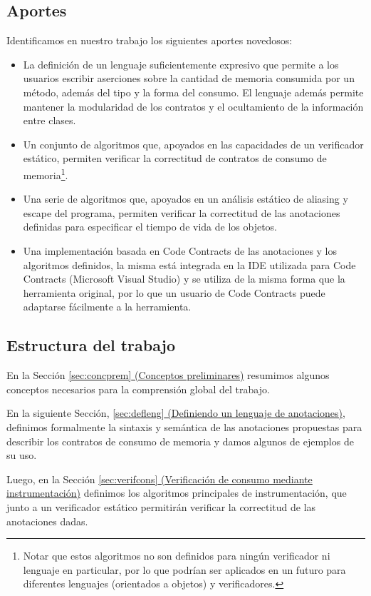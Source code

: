 \documentclass[12pt,a4paper]{article}
\begin{document}
		\subsection{Aportes}
			Identificamos en nuestro trabajo los siguientes aportes novedosos:
			\begin{itemize}
				\item
					La definición de un lenguaje suficientemente expresivo que permite a los usuarios escribir aserciones sobre la cantidad de memoria consumida por un método, además del tipo y la forma del consumo. El lenguaje además permite mantener la modularidad de los contratos y el ocultamiento de la información entre clases.
				\item
					Un conjunto de algoritmos que, apoyados en las capacidades de un verificador estático, permiten verificar la correctitud de contratos de consumo de memoria\footnote{Notar que estos algoritmos no son definidos para ningún verificador ni lenguaje en particular, por lo que podrían ser aplicados en un futuro para diferentes lenguajes (orientados a objetos) y verificadores.}.
				\item
					Una serie de algoritmos que, apoyados en un análisis estático de aliasing y escape del programa, permiten verificar la correctitud de las anotaciones definidas para especificar el tiempo de vida de los objetos.
				\item
					Una implementación basada en Code Contracts \cite{codecontracts} de las anotaciones y los algoritmos definidos, la misma está integrada en la IDE utilizada para Code Contracts (Microsoft Visual Studio) y se utiliza de la misma forma que la herramienta original, por lo que un usuario de Code Contracts puede adaptarse fácilmente a la herramienta.
			\end{itemize}
		\subsection{Estructura del trabajo}
			En la Sección \hyperref[sec:concprem]{\ref*{sec:concprem} (Conceptos preliminares)} resumimos algunos conceptos necesarios para la comprensión global del trabajo.

			En la siguiente Sección, \hyperref[sec:defleng]{\ref*{sec:defleng} (Definiendo un lenguaje de anotaciones)},  definimos formalmente la sintaxis y semántica de las anotaciones propuestas para describir los contratos de consumo de memoria y damos algunos de ejemplos de su uso.

			Luego, en la Sección \hyperref[sec:verifcons]{\ref*{sec:verifcons} (Verificación de consumo mediante instrumentación)} definimos los algoritmos principales de instrumentación, que junto a un verificador estático permitirán verificar la correctitud de las anotaciones dadas.
\end{document}
